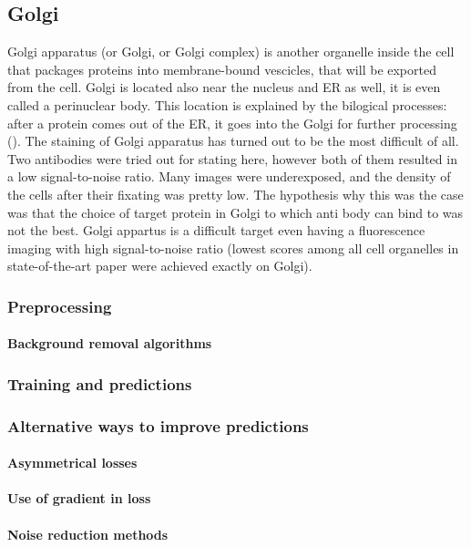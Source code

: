 \subsection{Golgi}
    Golgi apparatus (or Golgi, or Golgi complex) is another organelle inside the cell that packages proteins into membrane-bound vescicles, that will be exported from the cell. Golgi is located also near the nucleus and ER as well, it is even called a perinuclear body. This location is explained by the bilogical processes: after a protein comes out of the ER, it goes into the Golgi for further processing (\cite{golgi}). The staining of Golgi apparatus has turned out to be the most difficult of all. Two antibodies were tried out for stating here, however both of them resulted in a low signal-to-noise ratio. Many images were underexposed, and the density of the cells after their fixating was pretty low. The hypothesis why this was the case was that the choice of target protein in Golgi to which anti body can bind to was not the best. Golgi appartus is a difficult target even having a fluorescence imaging with high signal-to-noise ratio (lowest scores among all cell organelles in state-of-the-art \cite{Cheng_2021} paper were achieved exactly on Golgi).
    \subsubsection{Preprocessing}
        
        \paragraph{Background removal algorithms}
            \label{par:background-removal}
            
    \subsubsection{Training and predictions}
        

    \subsubsection{Alternative ways to improve predictions}
        \paragraph{Asymmetrical losses}
            
        \paragraph{Use of gradient in loss}
        \paragraph{Noise reduction methods}
